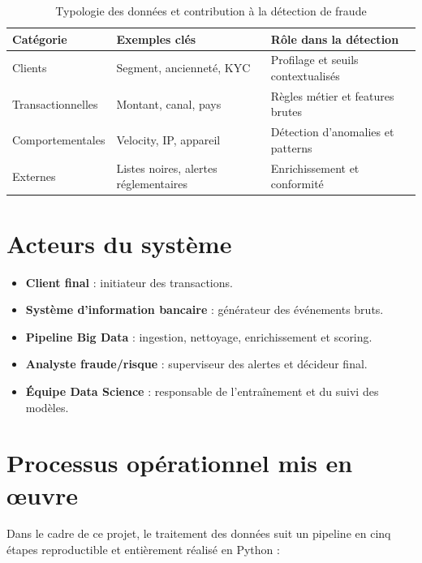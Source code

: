 \begin{table}[htbp]
    \centering
    \caption{Typologie des données et contribution à la détection de fraude}
    \label{tab:typologie_donnees}
    \begin{tabular}{|l|l|l|}
        \hline
        \textbf{Catégorie}       & \textbf{Exemples clés}               & \textbf{Rôle dans la détection} \\
        \hline
        Clients                  & Segment, ancienneté, KYC             & Profilage et seuils contextualisés \\
        Transactionnelles        & Montant, canal, pays                 & Règles métier et features brutes \\
        Comportementales         & Velocity, IP, appareil               & Détection d’anomalies et patterns \\
        Externes                 & Listes noires, alertes réglementaires & Enrichissement et conformité \\
        \hline
    \end{tabular}
\end{table}

\section{Acteurs du système}
\begin{itemize}
    \item \textbf{Client final} : initiateur des transactions.
    \item \textbf{Système d’information bancaire} : générateur des événements bruts.
    \item \textbf{Pipeline Big Data} : ingestion, nettoyage, enrichissement et scoring.
    \item \textbf{Analyste fraude/risque} : superviseur des alertes et décideur final.
    \item \textbf{Équipe Data Science} : responsable de l’entraînement et du suivi des modèles.
\end{itemize}

\section{Processus opérationnel mis en œuvre}
Dans le cadre de ce projet, le traitement des données suit un pipeline en cinq étapes reproductible et entièrement réalisé en Python :

